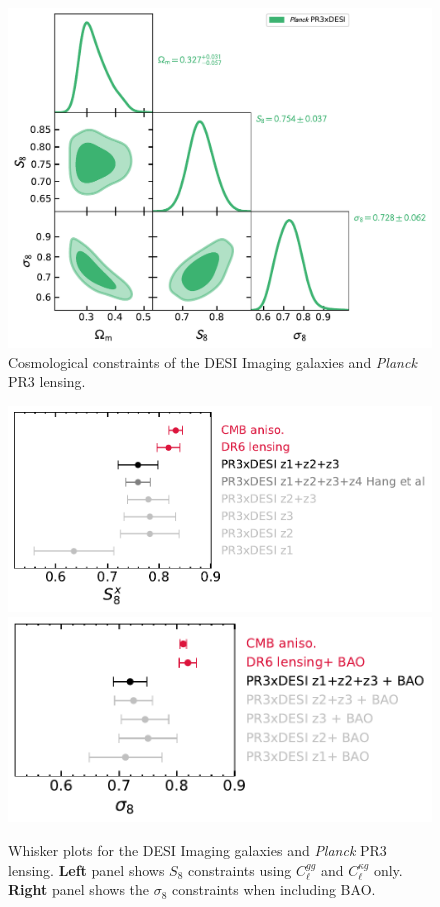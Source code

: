 \documentclass[twocolumn]{aastex631}
\begin{document}
{\begin{figure}
    \centering
\includegraphics{figures/PR3_reanalysis.pdf}
    \caption{Cosmological constraints of the DESI Imaging galaxies and \textit{Planck} PR3 lensing. }
    \label{fig:planckXcorner}
\end{figure}

\begin{figure}
    \centering
    \includegraphics[width=0.5\linewidth]{figures/s8_pr3.pdf}%
    \includegraphics[width=0.5\linewidth]{figures/sigma8_pr3.pdf}
    \caption{Whisker plots for the DESI Imaging galaxies and \textit{Planck} PR3 lensing. \textbf{Left} panel shows $S_8$ constraints using $C^{gg}_\ell$ and $C^{\kappa{g}}_\ell$ only. \textbf{Right} panel shows the $\sigma_8$ constraints when including BAO.}
    \label{fig:planckXcorner_fiducial}
\end{figure}






}
\end{document}
